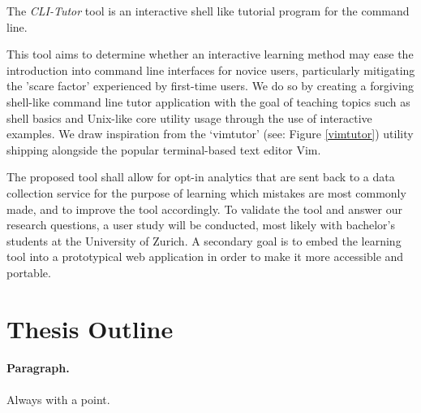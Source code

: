 The \textit{CLI-Tutor} tool is an interactive shell like tutorial program for
the command line.

This tool aims to determine whether an interactive learning method may ease the
introduction into command line interfaces for novice users, particularly
mitigating the 'scare factor' experienced by first-time users. We do so by
creating a forgiving shell-like command line tutor application with the goal of
teaching topics such as shell  basics and Unix-like core utility usage through
the use of interactive examples. We draw inspiration from the
`vimtutor'\cite{pierce_ware_smith_moolenaar_2019} (see: Figure \ref{vimtutor})
utility shipping alongside the popular terminal-based text editor Vim.

The proposed tool shall allow for opt-in analytics that are sent back to a data
collection service for the purpose of learning which mistakes are most commonly
made, and to improve the tool accordingly. To validate the tool and answer our
research questions, a user study will be conducted, most likely with bachelor's
students at the University of Zurich. A secondary goal is to embed the learning
tool into a prototypical web application in order to make it more accessible
and portable.

\section{Thesis Outline}

\paragraph{Paragraph.} Always with a point. {}
